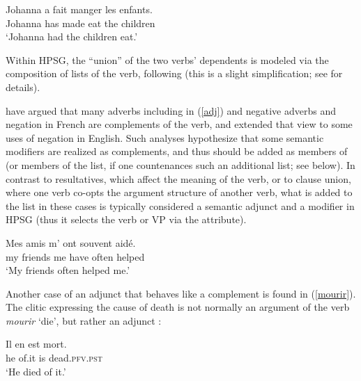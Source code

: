 \documentclass[output=paper
                ,modfonts
                ,nonflat
	        ,collection
	        ,collectionchapter
	        ,collectiontoclongg
 	        ,biblatex
                ,babelshorthands
                ,newtxmath
                ,draftmode
                ,colorlinks, citecolor=brown
]{./langsci/langscibook}
\begin{document}
\begin{exe}
\ex \label{faire}
\gll Johanna a fait manger les enfants. \\
Johanna has made eat the children \\
\glt `Johanna had the children eat.'
\end{exe}

\noindent
Within HPSG, the ``union'' of the two verbs' dependents is modeled via the composition of \argst lists of the  verb, following \citet{HinrichsandNakazawa1994} (this is a slight simplification; see   for details). 




\citet{AbeilleandGodard1997} have argued that many adverbs  including  in (\ref{adj}) and negative adverbs and negation in French are complements of the verb, and \citet{KimandSag2002} extended that view to some uses of negation in English. Such analyses hypothesize that some semantic modifiers are realized as complements, and thus should be added as members of \argst (or members of the \deps list, if one countenances such an additional list; see below). In contrast to resultatives,  which affect the meaning of the verb, or to clause union, where one verb co-opts the argument structure of another verb, what is added to the \argst list in these cases is typically considered a semantic adjunct and a modifier in HPSG (thus it selects the verb or VP via the  attribute). 

\begin{exe}
\ex\label{adj}
 \gll
	Mes amis m’ ont souvent aidé. \\
	my friends me have often helped \\
	\glt `My friends often helped me.'
\end{exe}


Another case of an adjunct that behaves like a complement is found in (\ref{mourir}).  The clitic  expressing the cause of death   is not normally an argument of the verb \textit{mourir} `die', but rather an adjunct \citep{KoenigandDavis2006}: %

\begin{exe}
	\ex\label{mourir}
	\gll Il en est mort. \\
	 he of.it is dead.\textsc{pfv.pst} \\
	 \glt `He died of it.' \citep[ex.\ 12a]{KoenigandDavis2006}
\end{exe}
\end{document}
